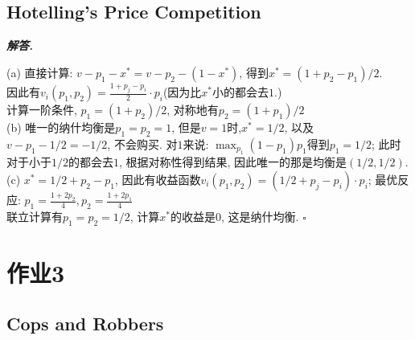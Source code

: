 \documentclass[10pt, a4paper, oneside]{ctexart}
\newenvironment{solution}{%
  \par\noindent\textbf{\textit{解答. }}\ignorespaces
}{%
  \hfill\ensuremath{\square}\par %
}
\begin{document}
\subsection{Hotelling's Price Competition}
\begin{solution}
(a) 直接计算: $v-p_1-x^*=v-p_2-(1-x^*)$, 得到$x^*=(1+p_2-p_1)/2$.\\
因此有$v_i(p_1,p_2)=\frac{1+p_j-p_i}{2}\cdot p_i$(因为比$x^*$小的都会去$1$.)\\
计算一阶条件, $p_1=(1+p_2)/2$, 对称地有$p_2=(1+p_1)/2$\\
(b) 唯一的纳什均衡是$p_1=p_2=1$, 但是$v=1$时,$x^*=1/2$, 以及$v-p_1-1/2=-1/2$, 不会购买. 对$1$来说: $\max_{p_1}(1-p_1)p_1$得到$p_1=1/2$; 此时对于小于$1/2$的都会去$1$, 根据对称性得到结果, 因此唯一的那是均衡是$(1/2,1/2)$.\\
(c) $x^*=1/2+p_2-p_1$, 因此有收益函数$v_i(p_1,p_2)=(1/2+p_j-p_i)\cdot p_i$; 最优反应: $p_1=\frac{1+2p_2}{4}, p_2=\frac{1+2p_1}{4}$\\
联立计算有$p_1=p_2=1/2$, 计算$x^*$的收益是$0$, 这是纳什均衡.
\end{solution}

\section{作业3}

\subsection{Cops and Robbers}
\end{document}
